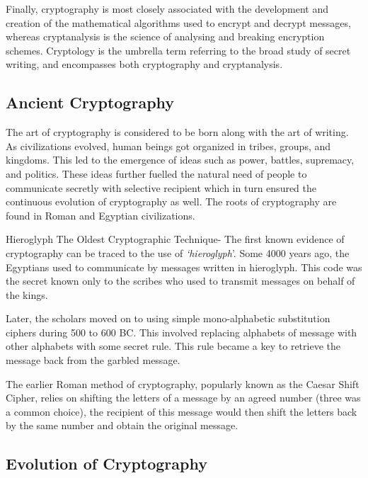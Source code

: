 \documentclass[british]{report}
\begin{document}
Finally, cryptography is most closely associated with the development
and creation of the mathematical algorithms used to encrypt and decrypt
messages, whereas cryptanalysis is the science of analysing and breaking
encryption schemes. Cryptology is the umbrella term referring to the
broad study of secret writing, and encompasses both cryptography and
cryptanalysis.

\subsection{Ancient Cryptography}

The art of cryptography is considered to be born along with the art
of writing. As civilizations evolved, human beings got organized in
tribes, groups, and kingdoms. This led to the emergence of ideas such
as power, battles, supremacy, and politics. These ideas further fuelled
the natural need of people to communicate secretly with selective
recipient which in turn ensured the continuous evolution of cryptography
as well. The roots of cryptography are found in Roman and Egyptian
civilizations.

Hieroglyph \textminus{} The Oldest Cryptographic Technique- The first
known evidence of cryptography can be traced to the use of \textit{`hieroglyph}'.
Some 4000 years ago, the Egyptians used to communicate by messages
written in hieroglyph. This code was the secret known only to the
scribes who used to transmit messages on behalf of the kings.

Later, the scholars moved on to using simple mono-alphabetic substitution
ciphers during 500 to 600 BC. This involved replacing alphabets of
message with other alphabets with some secret rule. This rule became
a key to retrieve the message back from the garbled message.

The earlier Roman method of cryptography, popularly known as the Caesar
Shift Cipher, relies on shifting the letters of a message by an agreed
number (three was a common choice), the recipient of this message
would then shift the letters back by the same number and obtain the
original message.

\subsection{Evolution of Cryptography}
\end{document}
